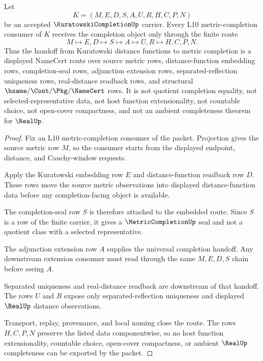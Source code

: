 \begin{theorem}
\label{thm:kuratowski-completion-metric-completion-handoff}
Let
$$
K=(M,E,D,S,A,U,R,H,C,P,N)
$$
be an accepted $\KuratowskiCompletionUp$ carrier. Every L10 metric-completion consumer of $K$ receives the completion object only through the finite route
$$
M \longmapsto E,D \longmapsto S \longmapsto A \longmapsto U,R \longmapsto H,C,P,N .
$$
Thus the handoff from Kuratowski distance functions to metric completion is a displayed NameCert route over source metric rows, distance-function embedding rows, completion-seal rows, adjunction extension rows, separated-reflection uniqueness rows, real-distance readback rows, and structural $\hsame/\Cont/\Pkg/\NameCert$ rows. It is not quotient completion equality, not selected-representative data, not host function extensionality, not countable choice, not open-cover compactness, and not an ambient completeness theorem for $\RealUp$.
\end{theorem}
\begin{proof}
Fix an L10 metric-completion consumer of the packet. Projection gives the source metric row $M$, so the consumer starts from the displayed endpoint, distance, and Cauchy-window requests.

Apply the Kuratowski embedding row $E$ and distance-function readback row $D$. These rows move the source metric observations into displayed distance-function data before any completion-facing object is available.

The completion-seal row $S$ is therefore attached to the embedded route. Since $S$ is a row of the finite carrier, it gives a $\MetricCompletionUp$ seal and not a quotient class with a selected representative.

The adjunction extension row $A$ supplies the universal completion handoff. Any downstream extension consumer must read through the same $M,E,D,S$ chain before seeing $A$.

Separated uniqueness and real-distance readback are downstream of that handoff. The rows $U$ and $R$ expose only separated-reflection uniqueness and displayed $\RealUp$ distance observations.

Transport, replay, provenance, and local naming close the route. The rows $H,C,P,N$ preserve the listed data componentwise, so no host function extensionality, countable choice, open-cover compactness, or ambient $\RealUp$ completeness can be exported by the packet.
\end{proof}

